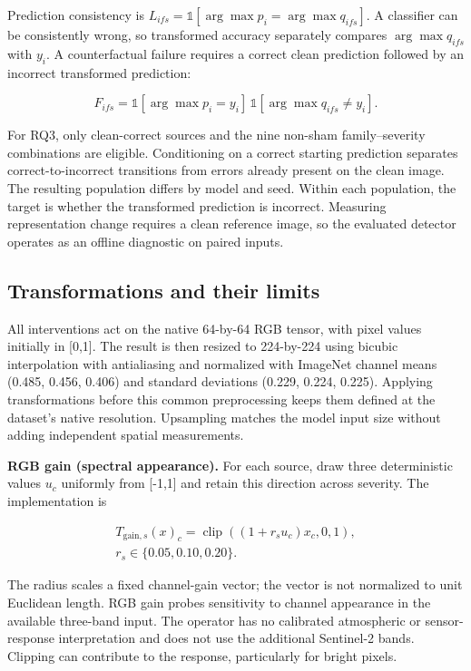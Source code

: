 Prediction consistency is \(L_{ifs}=\mathbb{1}[\arg\max p_i=\arg\max q_{ifs}]\). A classifier can be consistently wrong, so transformed accuracy separately compares \(\arg\max q_{ifs}\) with \(y_i\). A counterfactual failure requires a correct clean prediction followed by an incorrect transformed prediction:

\[
F_{ifs}=\mathbb{1}[\arg\max p_i=y_i]\,
         \mathbb{1}[\arg\max q_{ifs}\ne y_i].
\]

For RQ3, only clean-correct sources and the nine non-sham family--severity combinations are eligible. Conditioning on a correct starting prediction separates correct-to-incorrect transitions from errors already present on the clean image. The resulting population differs by model and seed. Within each population, the target is whether the transformed prediction is incorrect. Measuring representation change requires a clean reference image, so the evaluated detector operates as an offline diagnostic on paired inputs.

\subsection{Transformations and their limits}

All interventions act on the native 64-by-64 RGB tensor, with pixel values initially in [0,1]. The result is then resized to 224-by-224 using bicubic interpolation with antialiasing and normalized with ImageNet channel means (0.485, 0.456, 0.406) and standard deviations (0.229, 0.224, 0.225). Applying transformations before this common preprocessing keeps them defined at the dataset's native resolution. Upsampling matches the model input size without adding independent spatial measurements.

\textbf{RGB gain (spectral appearance).} For each source, draw three deterministic values \(u_c\) uniformly from [-1,1] and retain this direction across severity. The implementation is

\[
\begin{gathered}
T_{\mathrm{gain},s}(x)_c=\operatorname{clip}((1+r_su_c)x_c,0,1),\\
r_s\in\{0.05,0.10,0.20\}.
\end{gathered}
\]

The radius scales a fixed channel-gain vector; the vector is not normalized to unit Euclidean length. RGB gain probes sensitivity to channel appearance in the available three-band input. The operator has no calibrated atmospheric or sensor-response interpretation and does not use the additional Sentinel-2 bands. Clipping can contribute to the response, particularly for bright pixels.

